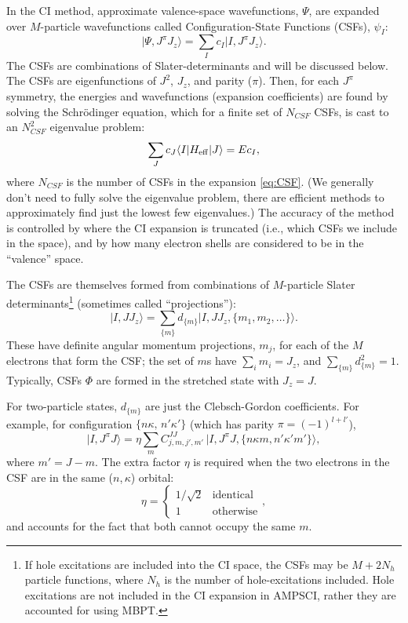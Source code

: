 \documentclass[10pt,twocolumn,a4paper]{article}%
\newcommand{\bra}[1]{\ensuremath{\langle #1|}}	%
\newcommand{\ket}[1]{\ensuremath{|#1\rangle}}
\newcommand{\be}{\begin{equation}}
\newcommand{\ee}{\end{equation}}
\begin{document}
In the CI method, approximate valence-space wavefunctions, $\Psi$, are expanded over $M$-particle wavefunctions called Configuration-State Functions (CSFs), $\psi_I$:
\be\label{eq:CSF}
    \ket{\Psi,J^\pi J_z} = \sum_I c_I \ket{I,J^\pi J_z}.
\ee
The CSFs are combinations of Slater-determinants
and will be discussed below.
The CSFs are eigenfunctions of $J^2$, $J_z$, and parity ($\pi$).
Then, for each $J^\pi$ symmetry, the energies and wavefunctions (expansion coefficients) are found by solving the Schr\"odinger equation, which for a finite set of $N_{CSF}$ CSFs, is cast to an $N_{CSF}^2$ eigenvalue problem:
\be\label{eq:Heff-CI}
    \sum_J c_J\bra{I}H_{\rm eff}\ket{J} = E c_I,
\ee
where $N_{CSF}$ is the number of CSFs in the expansion \eqref{eq:CSF}.
(We generally don't need to fully solve the eigenvalue problem, there are efficient methods to approximately find just the lowest few eigenvalues.)
The accuracy of the method is controlled by where the CI expansion is truncated (i.e., which CSFs we include in the space), and by how many electron shells are considered to be in the ``valence'' space.

The CSFs are themselves formed from combinations of $M$-particle Slater determinants\footnote{If hole excitations are included into the CI space, the CSFs may be $M+2N_h$ particle functions, where $N_h$ is the number of hole-excitations included. Hole excitations are not included in the CI expansion in AMPSCI, rather they are accounted for using MBPT.} (sometimes called ``projections''):
\be\label{eq:CSF-SD}
    \ket{I,J J_z} = \sum_{\{m\}} d_{\{m\}} \ket{I,J J_z,\{m_1,m_2,\ldots\}}.
\ee
These have definite angular momentum projections, $m_j$, for each of the $M$ electrons that form the CSF; the set of $m$s have $\sum_im_i=J_z$, and 
$
    \sum_{\{m\}} d_{\{m\}}^2=1.
$
Typically, CSFs $\Phi$ are formed in the stretched state with $J_z=J$.

For two-particle states, $d_{\{m\}}$ are just the Clebsch-Gordon coefficients.
For example, for configuration $\{n\kappa,\,n'\kappa'\}$ (which has parity $\pi=(-1)^{l+l'}$),
\be
    \ket{I,J^\pi J} = \eta \sum_m
C^{JJ}_{j,m,j',m'} \, 
    \ket{I,J^\pi J,\{n\kappa m,n'\kappa'm'\}},
\ee
where $m'=J-m$.
The extra factor $\eta$ is required when the two electrons in the CSF are in the same ($n$,\,$\kappa$) orbital:
\be
\eta = 
\begin{cases}
  1/\sqrt{2} & \text{identical}    \\
  1& \text{otherwise} 
\end{cases},
\ee
and accounts for the fact that both cannot occupy the same $m$.
\end{document}

